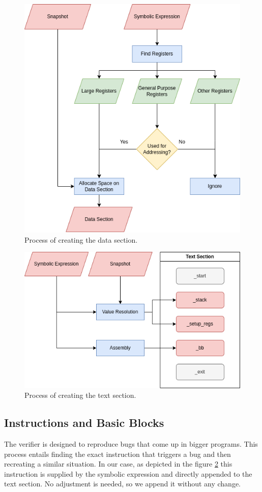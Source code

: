 \begin{figure}[ht]
    \centering
    \includegraphics[width=0.8\linewidth]{figures/data}
    \caption{Process of creating the data section.}
    \label{fig:data}
\end{figure}

\begin{figure}[ht]
    \centering
    \includegraphics[width=0.8\linewidth]{figures/text}
    \caption{Process of creating the text section.}
    \label{fig:text}
\end{figure}

\subsection{Instructions and Basic Blocks}
The verifier is designed to reproduce bugs that come up in bigger programs.
This process entails finding the exact instruction that triggers a bug and then recreating a similar situation.
In our case, as depicted in the figure \ref{fig:text} this instruction is supplied by the symbolic expression and directly appended to the text section.
No adjustment is needed, so we append it without any change.

